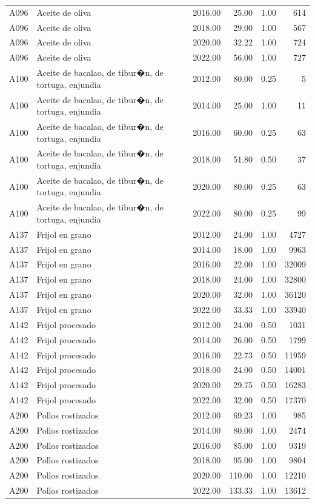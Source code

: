 \begin{table}[ht]
\begin{tabular}{llrrrr}
  A096 & Aceite de oliva & 2016.00 & 25.00 & 1.00 & 614 \\ 
  A096 & Aceite de oliva & 2018.00 & 29.00 & 1.00 & 567 \\ 
  A096 & Aceite de oliva & 2020.00 & 32.22 & 1.00 & 724 \\ 
  A096 & Aceite de oliva & 2022.00 & 56.00 & 1.00 & 727 \\ 
  A100 & Aceite de bacalao, de tibur�n, de tortuga, enjundia & 2012.00 & 80.00 & 0.25 &   5 \\ 
  A100 & Aceite de bacalao, de tibur�n, de tortuga, enjundia & 2014.00 & 25.00 & 1.00 &  11 \\ 
  A100 & Aceite de bacalao, de tibur�n, de tortuga, enjundia & 2016.00 & 60.00 & 0.25 &  63 \\ 
  A100 & Aceite de bacalao, de tibur�n, de tortuga, enjundia & 2018.00 & 51.80 & 0.50 &  37 \\ 
  A100 & Aceite de bacalao, de tibur�n, de tortuga, enjundia & 2020.00 & 80.00 & 0.25 &  63 \\ 
  A100 & Aceite de bacalao, de tibur�n, de tortuga, enjundia & 2022.00 & 80.00 & 0.25 &  99 \\ 
  A137 & Frijol en grano & 2012.00 & 24.00 & 1.00 & 4727 \\ 
  A137 & Frijol en grano & 2014.00 & 18.00 & 1.00 & 9963 \\ 
  A137 & Frijol en grano & 2016.00 & 22.00 & 1.00 & 32009 \\ 
  A137 & Frijol en grano & 2018.00 & 24.00 & 1.00 & 32800 \\ 
  A137 & Frijol en grano & 2020.00 & 32.00 & 1.00 & 36120 \\ 
  A137 & Frijol en grano & 2022.00 & 33.33 & 1.00 & 33940 \\ 
  A142 & Frijol procesado & 2012.00 & 24.00 & 0.50 & 1031 \\ 
  A142 & Frijol procesado & 2014.00 & 26.00 & 0.50 & 1799 \\ 
  A142 & Frijol procesado & 2016.00 & 22.73 & 0.50 & 11959 \\ 
  A142 & Frijol procesado & 2018.00 & 24.00 & 0.50 & 14001 \\ 
  A142 & Frijol procesado & 2020.00 & 29.75 & 0.50 & 16283 \\ 
  A142 & Frijol procesado & 2022.00 & 32.00 & 0.50 & 17370 \\ 
  A200 & Pollos rostizados & 2012.00 & 69.23 & 1.00 & 985 \\ 
  A200 & Pollos rostizados & 2014.00 & 80.00 & 1.00 & 2474 \\ 
  A200 & Pollos rostizados & 2016.00 & 85.00 & 1.00 & 9319 \\ 
  A200 & Pollos rostizados & 2018.00 & 95.00 & 1.00 & 9804 \\ 
  A200 & Pollos rostizados & 2020.00 & 110.00 & 1.00 & 12210 \\ 
  A200 & Pollos rostizados & 2022.00 & 133.33 & 1.00 & 13612 \\ 
   \bottomrule
\end{tabular}
\end{table}
